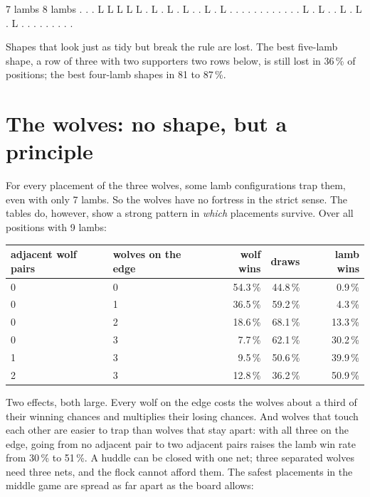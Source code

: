 \documentclass[11pt,a4paper]{article}
\begin{document}
\begin{board}
   7 lambs                     8 lambs
   . . . L L                   L L L . L
   . L . L .                   . L . L .
   . . . . .                   . . . . .
   . L . L .                   . L . L .
   L . . . .                   . . . . .
\end{board}

Shapes that look just as tidy but break the rule are lost. The best five-lamb
shape, a row of three with two supporters two rows below, is still lost in
36\,\% of positions; the best four-lamb shapes in 81 to 87\,\%.

\section*{The wolves: no shape, but a principle}

For every placement of the three wolves, some lamb configurations trap them,
even with only 7 lambs. So the wolves have no fortress in the strict sense. The
tables do, however, show a strong pattern in \emph{which} placements survive.
Over all positions with 9 lambs:

\begin{center}
\begin{tabular}{@{}llrrr@{}}
\toprule
adjacent wolf pairs & wolves on the edge & wolf wins & draws & lamb wins \\
\midrule
0 & 0 & 54.3\,\% & 44.8\,\% & 0.9\,\% \\
0 & 1 & 36.5\,\% & 59.2\,\% & 4.3\,\% \\
0 & 2 & 18.6\,\% & 68.1\,\% & 13.3\,\% \\
0 & 3 & 7.7\,\% & 62.1\,\% & 30.2\,\% \\
1 & 3 & 9.5\,\% & 50.6\,\% & 39.9\,\% \\
2 & 3 & 12.8\,\% & 36.2\,\% & 50.9\,\% \\
\bottomrule
\end{tabular}
\end{center}

Two effects, both large. Every wolf on the edge costs the wolves about a third
of their winning chances and multiplies their losing chances. And wolves that
touch each other are easier to trap than wolves that stay apart: with all three
on the edge, going from no adjacent pair to two adjacent pairs raises the lamb
win rate from 30\,\% to 51\,\%. A huddle can be closed with one net; three
separated wolves need three nets, and the flock cannot afford them. The safest
placements in the middle game are spread as far apart as the board allows:
\end{document}
